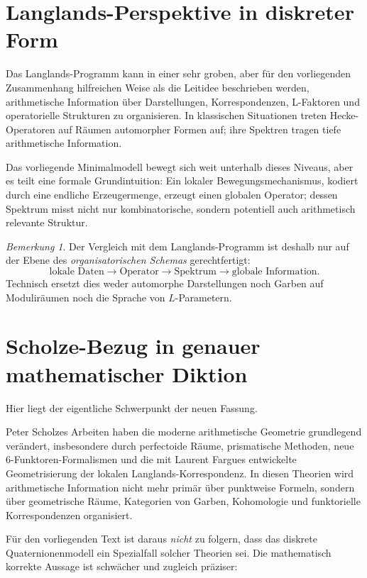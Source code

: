 \documentclass[12pt,a4paper]{article}
\theoremstyle{plain}
\theoremstyle{definition}
\theoremstyle{remark}
\newtheorem{bemerkung}[satz]{Bemerkung}
\begin{document}
\section{Langlands-Perspektive in diskreter Form}
Das Langlands-Programm kann in einer sehr groben, aber für den vorliegenden Zusammenhang hilfreichen Weise als die Leitidee beschrieben werden, arithmetische Information über Darstellungen, Korrespondenzen, L-Faktoren und operatorielle Strukturen zu organisieren. In klassischen Situationen treten Hecke-Operatoren auf Räumen automorpher Formen auf; ihre Spektren tragen tiefe arithmetische Information.

Das vorliegende Minimalmodell bewegt sich weit unterhalb dieses Niveaus, aber es teilt eine formale Grundintuition: Ein lokaler Bewegungsmechanismus, kodiert durch eine endliche Erzeugermenge, erzeugt einen globalen Operator; dessen Spektrum misst nicht nur kombinatorische, sondern potentiell auch arithmetisch relevante Struktur.

\begin{bemerkung}
Der Vergleich mit dem Langlands-Programm ist deshalb nur auf der Ebene des \emph{organisatorischen Schemas} gerechtfertigt:
\[
\text{lokale Daten} \longrightarrow \text{Operator} \longrightarrow \text{Spektrum} \longrightarrow \text{globale Information}.
\]
Technisch ersetzt dies weder automorphe Darstellungen noch Garben auf Moduliräumen noch die Sprache von \(L\)-Parametern.
\end{bemerkung}

\section{Scholze-Bezug in genauer mathematischer Diktion}
Hier liegt der eigentliche Schwerpunkt der neuen Fassung.

Peter Scholzes Arbeiten haben die moderne arithmetische Geometrie grundlegend verändert, insbesondere durch perfectoide Räume, prismatische Methoden, neue 6-Funktoren-Formalismen und die mit Laurent Fargues entwickelte Geometrisierung der lokalen Langlands-Korrespondenz. In diesen Theorien wird arithmetische Information nicht mehr primär über punktweise Formeln, sondern über geometrische Räume, Kategorien von Garben, Kohomologie und funktorielle Korrespondenzen organisiert.

Für den vorliegenden Text ist daraus \emph{nicht} zu folgern, dass das diskrete Quaternionenmodell ein Spezialfall solcher Theorien sei. Die mathematisch korrekte Aussage ist schwächer und zugleich präziser:
\end{document}
